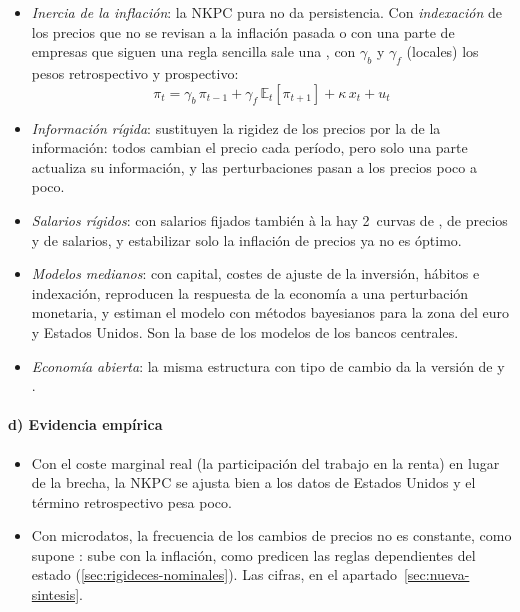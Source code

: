 \documentclass[11pt]{article}
\begin{document}
\begin{itemize}
\item \emph{Inercia de la inflación}: la NKPC pura no da persistencia. Con \emph{indexación} de los precios que no se revisan a la inflación pasada\nocite{ChristianoEichenbaumEvans2005} o con una parte de empresas que siguen una regla sencilla\nocite{GaliGertler1999Inflation} sale una , con $\gamma_b$ y $\gamma_f$ (locales) los pesos retrospectivo y prospectivo:
  \begin{equation}
  \pi_t=\gamma_b\,\pi_{t-1}+\gamma_f\,\mathbb{E}_t[\pi_{t+1}]+\kappa\,x_t+u_t \label{eq:nkpc-hibrida}
  \end{equation}
\item \emph{Información rígida}: \textcite{MankiwReis2002Sticky} sustituyen la rigidez de los precios por la de la información: todos cambian el precio cada período, pero solo una parte actualiza su información, y las perturbaciones pasan a los precios poco a poco.
\item \emph{Salarios rígidos}: con salarios fijados también à la \nocite{ErcegHendersonLevin2000Optimal} hay 2~curvas de , de precios y de salarios, y estabilizar solo la inflación de precios ya no es óptimo.
\item \emph{Modelos medianos}: con capital, costes de ajuste de la inversión, hábitos e indexación, \textcite{ChristianoEichenbaumEvans2005} reproducen la respuesta de la economía a una perturbación monetaria, y \textcite{SmetsWouters2003Estimated,SmetsWouters2007Shocks} estiman el modelo con métodos bayesianos para la zona del euro y Estados Unidos. Son la base de los modelos de los bancos centrales.
\item \emph{Economía abierta}: la misma estructura con tipo de cambio da la versión de  y  .
\end{itemize}

\paragraph{d) Evidencia empírica}

\begin{itemize}
\item Con el coste marginal real (la participación del trabajo en la renta) en lugar de la brecha, la NKPC se ajusta bien a los datos de Estados Unidos y el término retrospectivo pesa poco\nocite{GaliGertler1999Inflation}.
\item Con microdatos, la frecuencia de los cambios de precios no es constante, como supone : sube con la inflación, como predicen las reglas dependientes del estado (\ref{sec:rigideces-nominales}). Las cifras, en el apartado~\ref{sec:nueva-sintesis}.
\end{itemize}
\end{document}
